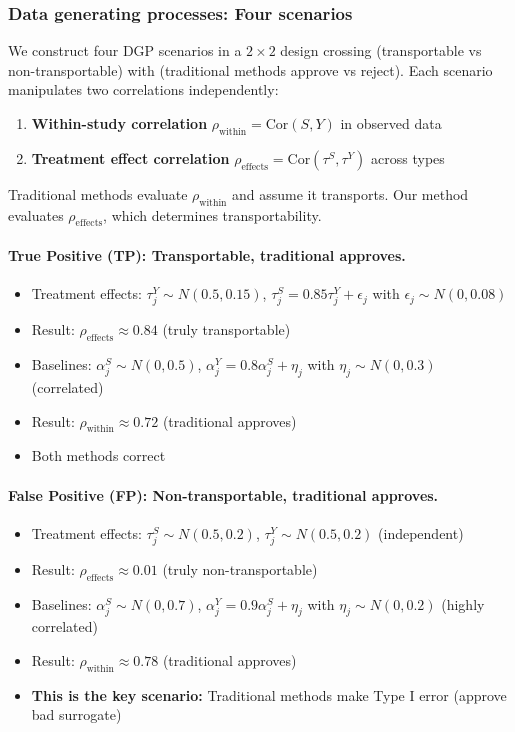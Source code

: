 \documentclass{article}
\begin{document}
\subsubsection{Data generating processes: Four scenarios}

We construct four DGP scenarios in a $2 \times 2$ design crossing (transportable vs non-transportable) with (traditional methods approve vs reject). Each scenario manipulates two correlations independently:
\begin{enumerate}
    \item \textbf{Within-study correlation} $\rho_{\text{within}} = \text{Cor}(S, Y)$ in observed data
    \item \textbf{Treatment effect correlation} $\rho_{\text{effects}} = \text{Cor}(\tau^S, \tau^Y)$ across types
\end{enumerate}

Traditional methods evaluate $\rho_{\text{within}}$ and assume it transports. Our method evaluates $\rho_{\text{effects}}$, which determines transportability.

\paragraph{True Positive (TP): Transportable, traditional approves.}
\begin{itemize}
    \item Treatment effects: $\tau_j^Y \sim N(0.5, 0.15)$, $\tau_j^S = 0.85 \tau_j^Y + \epsilon_j$ with $\epsilon_j \sim N(0, 0.08)$
    \item Result: $\rho_{\text{effects}} \approx 0.84$ (truly transportable)
    \item Baselines: $\alpha_j^S \sim N(0, 0.5)$, $\alpha_j^Y = 0.8 \alpha_j^S + \eta_j$ with $\eta_j \sim N(0, 0.3)$ (correlated)
    \item Result: $\rho_{\text{within}} \approx 0.72$ (traditional approves)
    \item Both methods correct
\end{itemize}

\paragraph{False Positive (FP): Non-transportable, traditional approves.}
\begin{itemize}
    \item Treatment effects: $\tau_j^S \sim N(0.5, 0.2)$, $\tau_j^Y \sim N(0.5, 0.2)$ (independent)
    \item Result: $\rho_{\text{effects}} \approx 0.01$ (truly non-transportable)
    \item Baselines: $\alpha_j^S \sim N(0, 0.7)$, $\alpha_j^Y = 0.9 \alpha_j^S + \eta_j$ with $\eta_j \sim N(0, 0.2)$ (highly correlated)
    \item Result: $\rho_{\text{within}} \approx 0.78$ (traditional approves)
    \item \textbf{This is the key scenario:} Traditional methods make Type I error (approve bad surrogate)
\end{itemize}
\end{document}
